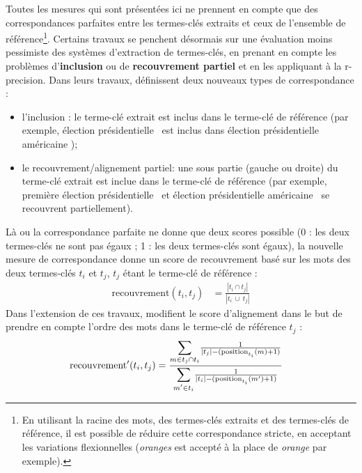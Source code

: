     Toutes les mesures qui sont présentées ici ne prennent en compte que des
    correspondances parfaites entre les termes-clés extraits et ceux de l'ensemble
    de référence\footnote{En utilisant la racine des mots, des termes-clés extraits et
    des termes-clés de référence, il est possible de réduire cette correspondance
    stricte, en acceptant les variations flexionnelles (\textit{oranges} est
    accepté à la place de \textit{orange} par exemple).}. Certains travaux se
    penchent désormais sur une évaluation moins pessimiste des systèmes
    d'extraction de termes-clés, en prenant en compte les problèmes
    d'\textbf{inclusion} ou de \textbf{recouvrement partiel}
    \citep{zesch2009rprecision, kim2010rprecision} et en les appliquant à la
    r-precision. Dans leurs travaux, \citet{zesch2009rprecision} définissent deux
    nouveaux types de correspondance :
    \begin{itemize}
      \item{l'inclusion : le terme-clé extrait est inclus dans le terme-clé de
            référence (par exemple, \og élection présidentielle \fg\ est inclus
            dans \og élection présidentielle américaine \fg);}
      \item{le recouvrement/alignement partiel: une sous partie (gauche ou
            droite) du terme-clé extrait est inclue dans le terme-clé de
            référence (par exemple, \og première élection présidentielle \fg\ et
            \og élection présidentielle américaine \fg\ se recouvrent
            partiellement).}
    \end{itemize}
    Là ou la correspondance parfaite ne donne que deux scores possible (0 : les
    deux termes-clés ne sont pas égaux ; 1 : les deux termes-clés sont égaux), la nouvelle
    mesure de correspondance donne un score de recouvrement basé sur les mots des
    deux termes-clés $t_i$ et $t_j$, $t_j$ étant le terme-clé de référence :
    \begin{align}
      \text{recouvrement}(t_{i}, t_{j}) &= \frac{|t_{i} \cap t_{j}|}{|t_{i}\ \cup\ t_{j}|}
    \end{align}
    Dans l'extension de ces travaux, \citet{kim2010rprecision} modifient le score
    d'alignement dans le but de prendre en compte l'ordre des mots dans le terme-clé
    de référence $t_j$ :
    \begin{align}
      \text{recouvrement}'(t_{i}, t_{j}) &= \frac{\mathlarger{\sum}_{m \in t_{j} \cap t_{i}} \frac{1}{|t_{j}| - (\text{position}_{t_i}(m) + 1)}}{\mathlarger{\sum}_{m' \in t_{i}} \frac{1}{|t_{i}| - (\text{position}_{t_i}(m') + 1)}}
    \end{align}

